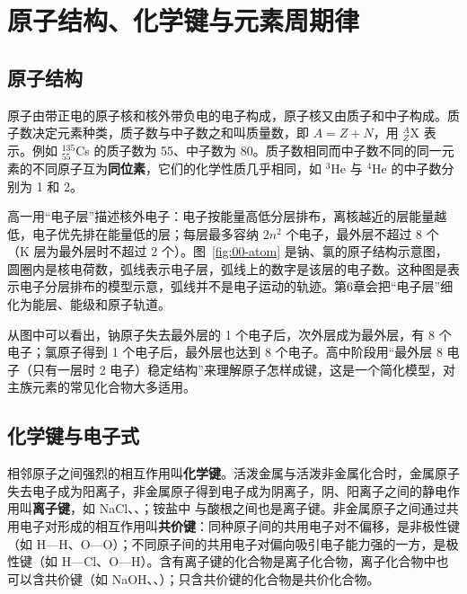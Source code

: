 \section{原子结构、化学键与元素周期律}

\subsection{原子结构}
原子由带正电的原子核和核外带负电的电子构成，原子核又由质子和中子构成。质子数决定元素种类，质子数与中子数之和叫质量数，即 $A=Z+N$，用 ${}^A_Z\mathrm{X}$ 表示。例如 ${}^{135}_{55}$Cs 的质子数为 55、中子数为 80。质子数相同而中子数不同的同一元素的不同原子互为\textbf{同位素}，它们的化学性质几乎相同，如 ${}^{3}$He 与 ${}^{4}$He 的中子数分别为 1 和 2。

高一用“电子层”描述核外电子：电子按能量高低分层排布，离核越近的层能量越低，电子优先排在能量低的层；每层最多容纳 $2n^2$ 个电子，最外层不超过 8 个（K 层为最外层时不超过 2 个）。图~\ref{fig:00-atom} 是钠、氯的原子结构示意图，圆圈内是核电荷数，弧线表示电子层，弧线上的数字是该层的电子数。这种图是表示电子分层排布的模型示意，弧线并不是电子运动的轨迹。第6章会把“电子层”细化为能层、能级和原子轨道。


从图中可以看出，钠原子失去最外层的 1 个电子后，次外层成为最外层，有 8 个电子；氯原子得到 1 个电子后，最外层也达到 8 个电子。高中阶段用“最外层 8 电子（只有一层时 2 电子）稳定结构”来理解原子怎样成键，这是一个简化模型，对主族元素的常见化合物大多适用。

\subsection{化学键与电子式}
相邻原子之间强烈的相互作用叫\textbf{化学键}。活泼金属与活泼非金属化合时，金属原子失去电子成为阳离子，非金属原子得到电子成为阴离子，阴、阳离子之间的静电作用叫\textbf{离子键}，如 NaCl、、；铵盐中  与酸根之间也是离子键。非金属原子之间通过共用电子对形成的相互作用叫\textbf{共价键}：同种原子间的共用电子对不偏移，是非极性键（如 H—H、O—O）；不同原子间的共用电子对偏向吸引电子能力强的一方，是极性键（如 H—Cl、O—H）。含有离子键的化合物是离子化合物，离子化合物中也可以含共价键（如 NaOH、、）；只含共价键的化合物是共价化合物。

